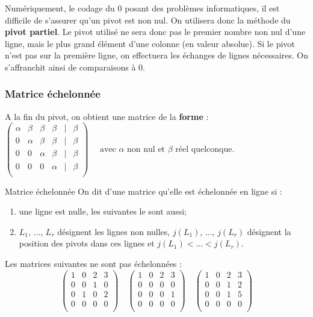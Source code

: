 {\begin{exemple}
\end{exemple}


\begin{remarque}
Numériquement, le codage du 0 posant des problèmes informatiques, il est difficile de s'assurer qu'un pivot est non nul. On utilisera donc la méthode du \textbf{pivot partiel}. Le pivot utilisé ne sera donc pas le premier nombre non nul d'une ligne, mais le plus grand élément d'une colonne (en valeur absolue). Si le pivot n'est pas sur la première ligne, on effectuera les échanges de lignes nécessaires. On s'affranchit ainsi de comparaisons à 0. 

\end{remarque}
\subsubsection{Matrice échelonnée}
A la fin du pivot, on obtient une matrice de la \textbf{forme} :
$
\begin{pmatrix}
\alpha &\beta & \beta & \beta &  | &\beta \\
0  & \alpha & \beta  &  \beta   &  | & \beta \\
0 & 0 &   \alpha& \beta &  | &\beta  \\
0 & 0 & 0 & \alpha &   | &\beta\\
\end{pmatrix}
\quad 
\text{ avec }\alpha \text{ non nul et }\beta \text{ réel quelconque.}
$

\begin{defi}{Matrice échelonnée}
On dit d'une matrice qu'elle est échelonnée en ligne si :
\begin{enumerate}
\item une ligne est nulle, les suivantes le sont aussi;
\item $L_1$, ..., $L_r$ désignent les lignes non nulles, $j(L_1)$, ..., $j(L_r)$ désignent la position des pivots dans ces lignes et $j(L_1)<...<j(L_r)$. 
\end{enumerate}
\end{defi}

\begin{exemple}
Les matrices suivantes ne sont pas échelonnées : 
$$
\begin{pmatrix}
1 & 0 & 2 & 3\\
0 & 0 & 1 & 0\\
0 & 1 & 0 & 2\\
0 & 0 & 0 & 0\\
\end{pmatrix}
\quad
\begin{pmatrix}
1 & 0 & 2 & 3\\
0 & 0 & 0 & 0\\
0 & 0 & 0 & 1\\
0 & 0 & 0 & 0\\
\end{pmatrix}
\quad
\begin{pmatrix}
1 & 0 & 2 & 3\\
0 & 0 & 1 & 2\\
0 & 0 & 1 & 5\\
0 & 0 & 0 & 0\\
\end{pmatrix}
$$
\end{exemple}

}
